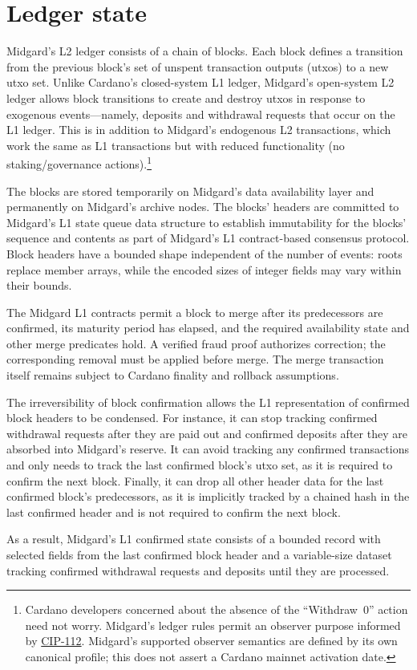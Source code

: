 \documentclass[../midgard.tex]{subfiles}
\begin{document}
\chapter{Ledger state}
\label{h:ledger-state}

Midgard's L2 ledger consists of a chain of blocks.
Each block defines a transition from the previous block's set of unspent transaction outputs (utxos) to a new utxo set.
Unlike Cardano's closed-system L1 ledger, Midgard's open-system L2 ledger allows block transitions to create and destroy utxos in response to exogenous events---namely, deposits and withdrawal requests that occur on the L1 ledger.
This is in addition to Midgard's endogenous L2 transactions, which work the same as L1 transactions but with reduced functionality (no staking/governance actions).\footnote{Cardano developers concerned about the absence of the ``Withdraw~0'' action need not worry.
Midgard's ledger rules permit an observer purpose informed by \href{https://github.com/cardano-foundation/CIPs/tree/master/CIP-0112}{CIP-112}.
Midgard's supported observer semantics are defined by its own canonical profile; this does not assert a Cardano mainnet activation date.}

The blocks are stored temporarily on Midgard's data availability layer and permanently on Midgard's archive nodes.
The blocks' headers are committed to Midgard's L1 state queue data structure to establish immutability for the blocks' sequence and contents as part of Midgard's L1 contract-based consensus protocol.
Block headers have a bounded shape independent of the number of events: roots replace member arrays, while the encoded sizes of integer fields may vary within their bounds.

The Midgard L1 contracts permit a block to merge after its predecessors are confirmed, its maturity period has elapsed, and the required availability state and other merge predicates hold.
A verified fraud proof authorizes correction; the corresponding removal must be applied before merge.
The merge transaction itself remains subject to Cardano finality and rollback assumptions.

The irreversibility of block confirmation allows the L1 representation of confirmed block headers to be condensed.
For instance, it can stop tracking confirmed withdrawal requests after they are paid out and confirmed deposits after they are absorbed into Midgard's reserve.
It can avoid tracking any confirmed transactions and only needs to track the last confirmed block's utxo set, as it is required to confirm the next block.
Finally, it can drop all other header data for the last confirmed block's predecessors, as it is implicitly tracked by a chained hash in the last confirmed header and is not required to confirm the next block.

As a result, Midgard's L1 confirmed state consists of a bounded record with selected fields from the last confirmed block header and a variable-size dataset tracking confirmed withdrawal requests and deposits until they are processed.
\end{document}
